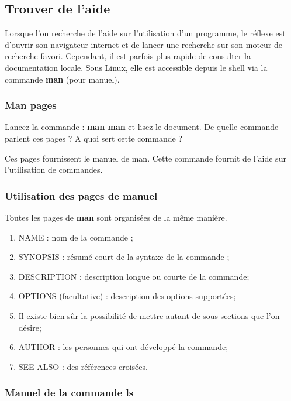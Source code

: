 \documentclass[11pt]{article}
\begin{document}
\subsection{Trouver de l'aide}

Lorsque l'on recherche de l'aide sur l'utilisation d'un programme, le réflexe est d'ouvrir son navigateur internet et de
lancer une recherche sur son moteur de recherche favori. Cependant, il est parfois plus rapide de consulter la 
documentation locale. Sous Linux, elle est accessible depuis le shell via la commande \textbf{man} (pour manuel).

\subsubsection{Man pages}

Lancez la commande : \textbf{man man} et lisez le document. De quelle commande parlent ces pages ? A quoi sert cette commande ?

\begin{solution}
 Ces pages fournissent le manuel de man. Cette commande fournit de l'aide sur l'utilisation de commandes.
\end{solution}

\subsubsection{Utilisation des pages de manuel}

Toutes les pages de \textbf{man} sont organisées de la même manière.

\begin{enumerate}
 \item{NAME} : nom de la commande ;
 \item{SYNOPSIS} : résumé court de la syntaxe de la commande ;
 \item{DESCRIPTION} : description longue ou courte de la commande;
 \item{OPTIONS} (facultative) : description des options supportées;
 \item Il existe bien sûr la possibilité de mettre autant de sous-sections que l'on désire;
 \item{AUTHOR} : les personnes qui ont développé la commande;
 \item{SEE ALSO} : des références croisées.
\end{enumerate}

\subsubsection{Manuel de la commande \textbf{ls}}
\end{document}
